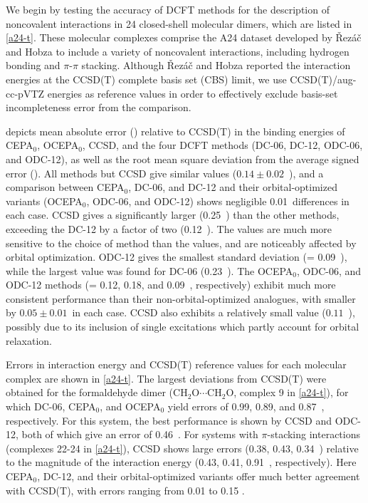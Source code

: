 We begin by testing the accuracy of DCFT methods for the description of
noncovalent interactions in 24 closed-shell molecular dimers, which are listed
in \cref{a24-t}.
These molecular complexes comprise the A24 dataset\cite{Rezac:2013p2151}
developed by \v{R}ez\'a\v{c} and Hobza to include a variety of noncovalent
interactions, including hydrogen bonding and $\pi$-$\pi$ stacking.
Although \v{R}ez\'a\v{c} and Hobza reported the interaction energies at the
CCSD(T) complete basis set (CBS) limit, we use CCSD(T)/aug-cc-pVTZ energies as
reference values in order to effectively exclude basis-set incompleteness error
from the comparison.

 depicts mean absolute error (\mae) relative to CCSD(T) in the
binding energies of CEPA$_0$, OCEPA$_0$, CCSD, and the four DCFT methods (DC-06,
DC-12, ODC-06, and ODC-12), as well as the root mean square deviation from the
average signed error (\std).
All methods but CCSD give similar \mae values ($0.14\pm 0.02$~\kcal), and a
comparison between CEPA$_0$, DC-06, and DC-12 and their orbital-optimized
variants (OCEPA$_0$, ODC-06, and ODC-12) shows negligible 0.01~\kcal differences
in each case.
CCSD gives a significantly larger \mae (0.25~\kcal) than the other methods,
exceeding the DC-12 \mae by a factor of two (0.12~\kcal).
The \std values are much more sensitive to the choice of method than the \mae
values, and are noticeably affected by orbital optimization.
ODC-12 gives the smallest standard deviation (\std = 0.09~\kcal), while the
largest \std value was found for DC-06 (0.23~\kcal). The OCEPA$_0$, ODC-06, and
ODC-12 methods (\std = 0.12, 0.18, and 0.09~\kcal, respectively) exhibit much
more consistent performance than their non-orbital-optimized analogues, with
\std smaller by $0.05\pm 0.01$~\kcal in each case.
CCSD also exhibits a relatively small \std value ($0.11$~\kcal), possibly due to
its inclusion of single excitations which partly account for orbital relaxation.

Errors in interaction energy and CCSD(T) reference values for each molecular
complex are shown in \cref{a24-t}.
The largest deviations from CCSD(T) were obtained for the formaldehyde dimer
($\mathrm{CH_2O }\cdots\mathrm{CH_2O }$, complex 9 in \cref{a24-t}), for which
DC-06, CEPA$_0$, and OCEPA$_0$ yield errors of 0.99, 0.89, and 0.87~\kcal,
respectively.
For this system, the best performance is shown by CCSD and ODC-12, both of which
give an error of 0.46~\kcal.
For systems with $\pi$-stacking interactions (complexes 22-24 in \cref{a24-t}),
CCSD shows large errors (0.38, 0.43, 0.34~\kcal) relative to the magnitude of
the interaction energy (0.43, 0.41, 0.91~\kcal, respectively).
Here CEPA$_0$, DC-12, and their orbital-optimized variants offer much better
agreement with CCSD(T), with errors ranging from 0.01 to 0.15 \kcal.


